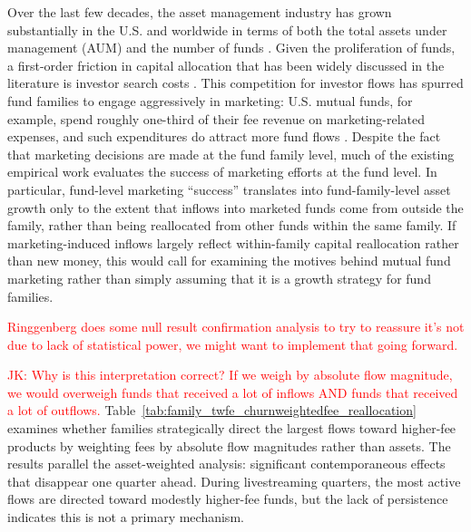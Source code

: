 \documentclass[12pt]{article}
\begin{document}
Over the last few decades, the asset management industry has grown substantially in the U.S. and worldwide in terms of both the total assets under management (AUM) and the number of funds \citep{pastor2015scale,ici2025:ch1}. Given the proliferation of funds, a first-order friction in capital allocation that has been widely discussed in the literature is investor search costs \citep{hortacsu2004,huang2007participation,roussanov2021marketing}. This competition for investor flows has spurred fund families to engage aggressively in marketing: U.S. mutual funds, for example, spend roughly one-third of their fee revenue on marketing-related expenses, and such expenditures do attract more fund flows \citep{sirri1998costly,huang2007participation,gallaher2008advertising,christofferson2013what}. Despite the fact that marketing decisions are made at the fund family level, much of the existing empirical work evaluates the success of marketing efforts at the fund level. In particular, fund-level marketing ``success'' translates into fund-family-level asset growth only to the extent that inflows into marketed funds come from outside the family, rather than being reallocated from other funds within the same family. If marketing-induced inflows largely reflect within-family capital reallocation rather than new money, this would call for examining the motives behind mutual fund marketing rather than simply assuming that it is a growth strategy for fund families.




\textcolor{red}{Ringgenberg does some null result confirmation analysis to try to reassure it's not due to lack of statistical power, we might want to implement that going forward.}

\textcolor{red}{JK: Why is this interpretation correct? If we weigh by absolute flow magnitude, we would overweigh funds that received a lot of inflows AND funds that received a lot of outflows.}
Table~\ref{tab:family_twfe_churnweightedfee_reallocation} examines whether families strategically direct the largest flows toward higher-fee products by weighting fees by absolute flow magnitudes rather than assets. The results parallel the asset-weighted analysis: significant contemporaneous effects that disappear one quarter ahead. During livestreaming quarters, the most active flows are directed toward modestly higher-fee funds, but the lack of persistence indicates this is not a primary mechanism.
\end{document}
